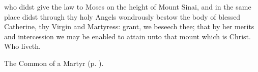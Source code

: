 {} who didst give the law to Moses on the height of Mount Sinai, and in the same place didst through thy holy Angels wondrously bestow the body of blessed Catherine, thy Virgin and Martyress: grant, we beseech thee; that by her merits and intercession we may be enabled to attain unto that mount which is Christ. Who liveth.


\begin{rubric}
	The Common of a Martyr (p. \pageref{CommonMartyrBishopCollect}).
\end{rubric}

